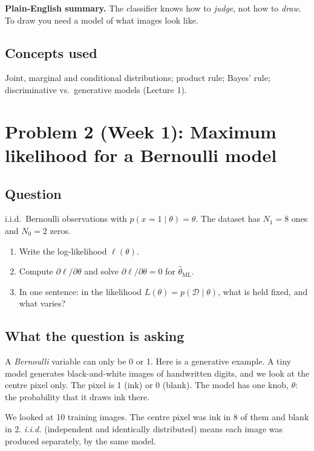 \documentclass[12pt,a4paper]{article}
\begin{document}
\textbf{Plain-English summary.} The classifier knows how to \emph{judge}, not how to \emph{draw}. To draw you need a model of what images look like.

\subsection{Concepts used}

Joint, marginal and conditional distributions; product rule; Bayes' rule; discriminative vs.\ generative models (Lecture 1).

\section{Problem 2 (Week 1): Maximum likelihood for a Bernoulli model}

\subsection{Question}

i.i.d.\ Bernoulli observations with $p(x = 1 \mid \theta) = \theta$. The dataset has $N_1 = 8$ ones and $N_0 = 2$ zeros.

\begin{enumerate}[leftmargin=*]
\item Write the log-likelihood $\ell(\theta)$.
\item Compute $\partial \ell / \partial \theta$ and solve $\partial \ell / \partial \theta = 0$ for $\hat{\theta}_{\mathrm{ML}}$.
\item In one sentence: in the likelihood $L(\theta) = p(\mathcal{D} \mid \theta)$, what is held fixed, and what varies?
\end{enumerate}

\subsection{What the question is asking}

A \emph{Bernoulli} variable can only be 0 or 1. Here is a generative example. A tiny model generates black-and-white images of handwritten digits, and we look at the centre pixel only. The pixel is 1 (ink) or 0 (blank). The model has one knob, $\theta$: the probability that it draws ink there.

We looked at 10 training images. The centre pixel was ink in 8 of them and blank in 2. \emph{i.i.d.} (independent and identically distributed) means each image was produced separately, by the same model.
\end{document}
